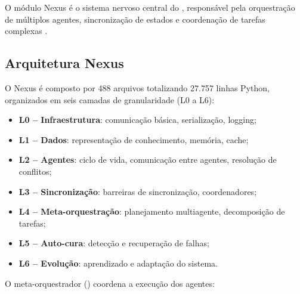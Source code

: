 O módulo Nexus é o sistema nervoso central do \opencodeeco{},
responsável pela orquestração de múltiplos agentes, sincronização de
estados e coordenação de tarefas complexas
\cite{wooldridge2009multiagent, weiss2013multiagent,
park2023generative}.

\subsection{Arquitetura Nexus}
\label{subsec:nexus-arquitetura}

O Nexus é composto por 488 arquivos totalizando 27.757 linhas Python,
organizados em seis camadas de granularidade (L0 a L6):

\begin{itemize}
\item \textbf{L0 -- Infraestrutura}: comunicação básica, serialização,
logging;
\item \textbf{L1 -- Dados}: representação de conhecimento, memória, cache;
\item \textbf{L2 -- Agentes}: ciclo de vida, comunicação entre agentes,
resolução de conflitos;
\item \textbf{L3 -- Sincronização}: barreiras de sincronização,
coordenadores;
\item \textbf{L4 -- Meta-orquestração}: planejamento multiagente,
decomposição de tarefas;
\item \textbf{L5 -- Auto-cura}: detecção e recuperação de falhas;
\item \textbf{L6 -- Evolução}: aprendizado e adaptação do sistema.
\end{itemize}

O meta-orquestrador ()
coordena a execução dos agentes:

